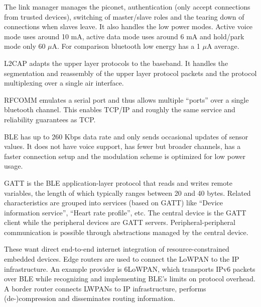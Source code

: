 \begin{mytitle} The link manager manages the piconet, authentication (only accept connections from trusted devices), switching of master/slave roles and the tearing down of connections when slaves leave. It also handles the low power modes. Active voice mode uses around 10 mA, active data mode uses around 6 mA and hold/park mode only 60 $\mu$A. For comparison bluetooth low energy has a 1 $\mu$A average.
\end{mytitle}
\begin{mytitle} L2CAP adapts the upper layer protocols to the baseband. It handles the segmentation and reassembly of the upper layer protocol packets and the protocol multiplexing over a single air interface.
\end{mytitle}
\begin{mytitle} RFCOMM emulates a serial port and thus allows multiple ``ports'' over a single bluetooth channel. This enables TCP/IP and roughly the same service and reliability guarantees as TCP.
\end{mytitle}
\begin{mytitle} BLE has up to 260 Kbps data rate and only sends occasional updates of sensor values. It does not have voice support, has fewer but broader channels, has a faster connection setup and the modulation scheme is optimized for low power usage.
\end{mytitle}
\begin{mytitle} GATT is the BLE application-layer protocol that reads and writes remote variables, the length of which typically ranges between 20 and 40 bytes. Related characteristics are grouped into services (based on GATT) like ``Device information service'', ``Heart rate profile'', etc. The central device is the GATT client while the peripheral devices are GATT servers. Peripheral-peripheral communication is possible through abstractions managed by the central device.
\end{mytitle}
\begin{mytitle} These want direct end-to-end internet integration of resource-constrained embedded devices. Edge routers are used to connect the LoWPAN to the IP infrastructure. An example provider is 6LoWPAN, which transports IPv6 packets over BLE while recognizing and implementing BLE's limits on protocol overhead. A border router connects LWPANs to IP infrastructure, performs (de-)compression and disseminates routing information.
\end{mytitle}

